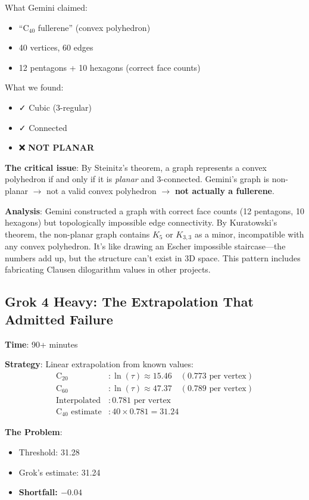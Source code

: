 \documentclass[11pt]{article}
\begin{document}
What Gemini claimed:
\begin{itemize}
\item ``C$_{40}$ fullerene'' (convex polyhedron)
\item 40 vertices, 60 edges
\item 12 pentagons + 10 hexagons (correct face counts)
\end{itemize}

What we found:
\begin{itemize}
\item ✓ Cubic (3-regular)
\item ✓ Connected
\item ❌ \textbf{NOT PLANAR}
\end{itemize}

\textbf{The critical issue}: By Steinitz's theorem, a graph represents a convex polyhedron if and only if it is \textit{planar} and 3-connected. Gemini's graph is non-planar $\rightarrow$ not a valid convex polyhedron $\rightarrow$ \textbf{not actually a fullerene}.

\textbf{Analysis}: Gemini constructed a graph with correct face counts (12 pentagons, 10 hexagons) but topologically impossible edge connectivity. By Kuratowski's theorem, the non-planar graph contains $K_5$ or $K_{3,3}$ as a minor, incompatible with any convex polyhedron. It's like drawing an Escher impossible staircase---the numbers add up, but the structure can't exist in 3D space. This pattern includes fabricating Clausen dilogarithm values in other projects.

\subsection{Grok 4 Heavy: The Extrapolation That Admitted Failure}

\textbf{Time}: 90+ minutes

\textbf{Strategy}: Linear extrapolation from known values:
\begin{align*}
\text{C}_{20}&: \ln(\tau) \approx 15.46 \quad (0.773 \text{ per vertex}) \\
\text{C}_{60}&: \ln(\tau) \approx 47.37 \quad (0.789 \text{ per vertex}) \\
\text{Interpolated}&: 0.781 \text{ per vertex} \\
\text{C}_{40} \text{ estimate}&: 40 \times 0.781 = \mathbf{31.24}
\end{align*}

\textbf{The Problem}:
\begin{itemize}
\item Threshold: 31.28
\item Grok's estimate: 31.24
\item \textbf{Shortfall: $-0.04$}
\end{itemize}
\end{document}
